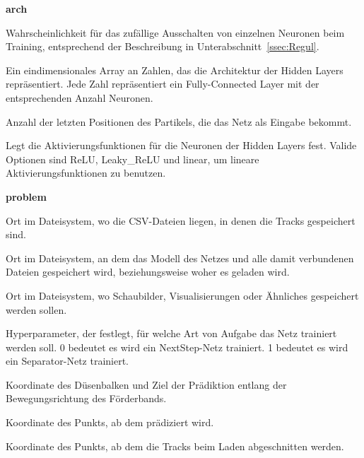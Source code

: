 
\newpage
{\Large \sffamily \textbf{arch}}
\begin{description}[leftmargin=!,labelwidth=\widthof{\bfseries separatorPosition}, labelindent=0.5cm]
    \item [dropoutRate] Wahrscheinlichkeit für das zufällige Ausschalten von einzelnen Neuronen beim Training, entsprechend der Beschreibung in Unterabschnitt~\ref{ssec:Regul}.
    \item [hiddenLayers] Ein ein­di­men­si­o­nales Array an Zahlen, das die Architektur der Hidden Layers repräsentiert. Jede Zahl repräsentiert ein Fully-Connected Layer mit der entsprechenden Anzahl Neuronen.
    \item [featureSize] Anzahl der letzten Positionen des Partikels, die das Netz als Eingabe bekommt.
    \item [activation] Legt die Aktivierungsfunktionen für die Neuronen der Hidden Layers fest. Valide Optionen sind ReLU, Leaky\_ReLU und linear, um lineare Aktivierungsfunktionen zu benutzen.
\end{description}

\bigskip
{\Large \sffamily \textbf{problem}}

\begin{description}[leftmargin=!,labelwidth=\widthof{\bfseries separatorPosition}, labelindent=0.5cm]
    \item[dataPath] Ort im Dateisystem, wo die CSV-Dateien liegen, in denen die Tracks gespeichert sind.
    \item[modelBasePath] Ort im Dateisystem, an dem das Modell des Netzes und alle damit verbundenen Dateien gespeichert wird, beziehungsweise woher es geladen wird. 
    \item [imagePath] Ort im Dateisystem, wo Schaubilder, Visualisierungen oder Ähnliches gespeichert werden sollen.
    \item [separator] Hyperparameter, der festlegt, für welche Art von Aufgabe das Netz trainiert werden soll. 0 bedeutet es wird ein NextStep-Netz trainiert. 1 bedeutet es wird ein Separator-Netz trainiert.
\end{description}

\begin{description}[leftmargin=!,labelwidth=\widthof{\bfseries separatorPosition}, labelindent=0.5cm]
    \item[separatorPosition] Koordinate des Düsenbalken und Ziel der Prädiktion entlang der Bewegungsrichtung des Förderbands.
    \item[thresholdPoint] Koordinate des Punkts, ab dem prädiziert wird.
    \item[predictionCutOff] Koordinate des Punkts, ab dem die Tracks beim Laden abgeschnitten werden.
\end{description}

